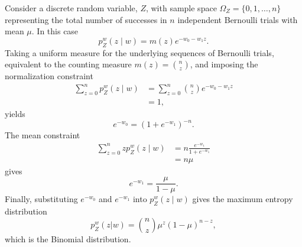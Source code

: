 \begin{example}
	Consider a discrete random variable, $Z$, with sample space $\Omega_Z = \{0,1,\dots,n\}$ representing the total number of successes in $n$ independent Bernoulli trials with mean $\mu$. In this case
	\begin{equation}
		p_{Z}^w(z \mid w) = m(z) e^{-w_0 - w_1 z}.
	\end{equation}
	Taking a uniform measure for the underlying sequences of Bernoulli trials, equivalent to the counting measure $m(z) = \binom{n}{z}$, and imposing the normalization constraint
	\begin{equation}
		\begin{split}
			\sum_{z=0}^n p_{Z}^w(z \mid w) &= \sum_{z=0}^n \binom{n}{z} e^{-w_0 - w_1 z}\\
			& = 1,
		\end{split}
	\end{equation}
	yields
	\begin{equation}
		e^{-w_0} = (1 + e^{-w_1})^{-n}.
	\end{equation}
	The mean constraint
	\begin{equation}
		\begin{split}
			\sum_{z=0}^n z p_{Z}^w(z \mid w) &= n \frac{e^{-w_1}}{1 + e^{-w_1}}\\
			& = n\mu
		\end{split}
	\end{equation}
	gives
	\begin{equation}
		e^{-w_1} = \frac{\mu}{1-\mu}.
	\end{equation}
	Finally, substituting $e^{-w_0}$ and $e^{-w_1}$ into $p_{Z}^w(z \mid w)$ gives the maximum entropy distribution
	\begin{equation}
		p_{Z}^w(z|w) = \binom{n}{z} \mu^z (1-\mu)^{n-z},
	\end{equation}
	which is the Binomial distribution.
\end{example}



